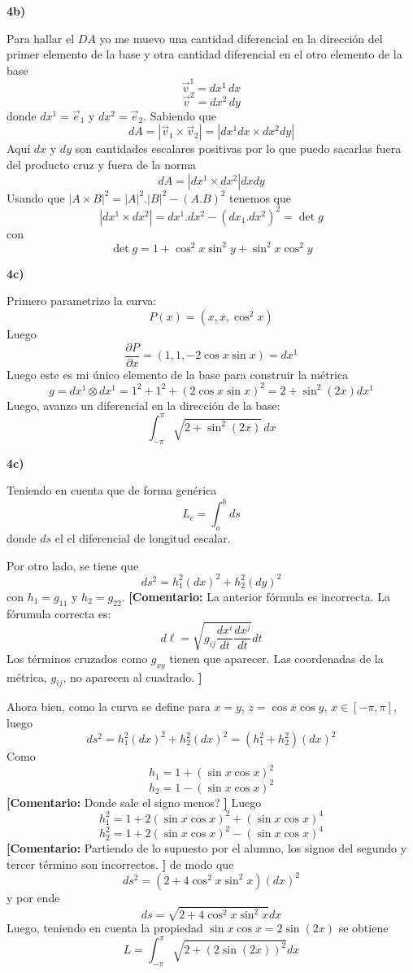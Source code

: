 \documentclass[11pt,spanish]{article}
\newcommand{\comentario}[1]{{\color{red} {\bf [Comentario:} #1 {\bf ]}}}
\begin{document}
\vspace{0.5cm}
{\bf 4b)}
\vspace{0.5cm}

Para hallar el $DA$ yo me muevo una cantidad diferencial en la direcci\'on del primer elemento de la base y otra cantidad diferencial en el otro elemento de la base
$$
\vec{v}^1 = dx^1\, dx
$$
$$
\vec{v}^2 = dx^2\, dy
$$
donde $dx^1 = \vec{e}_1$ y $dx^2 = \vec{e}_2$.
Sabiendo que
$$
dA = |\vec{v}_1 \times \vec{v}_2| = |dx^1 dx \times dx^2 dy|
$$
Aqu\'i $dx$ y $dy$ son cantidades escalares positivas por lo que puedo sacarlas fuera del producto cruz y fuera de la norma
$$
dA = |dx^1 \times dx^2 | dx dy
$$
Usando que $|A\times B|^2 = |A|^2 . |B|^2 - (A.B)^2$ tenemos que
$$
|dx^1 \times dx^2|
=
dx^1 . dx^2 - (dx_1.dx^2)^2 
= 
\det g
$$
con
$$
\det g
=
1+\cos^2 x\sin^2 y + \sin^2 x\cos^2 y
$$

\vspace{0.5cm}
{\bf 4c)}
\vspace{0.5cm}

Primero parametrizo la curva:
$$
P(x) = (x,x,\cos^2 x)
$$
Luego
$$
\frac{\partial P}{\partial x}
=
(1,1,-2\cos x\sin x) 
=
dx^1
$$
Luego este es mi \'unico elemento de la base para construir la m\'etrica
$$
g 
= 
dx^1 \otimes dx^1
=
1^2 + 1^2 + (2\cos x\sin x)^2
=
2+\sin^2(2x) dx^1
$$
Luego, avanzo un diferencial en la direcci\'on de la base:
$$
\int_{-\pi}^{\pi}
\sqrt{2+\sin^2 (2x)}\,dx
$$

\vspace{0.5cm}

\vspace{0.5cm}
{\bf 4c)}
\vspace{0.5cm}

Teniendo en cuenta que de forma gen\'erica
$$
L_c = \int_a^b ds
$$
donde $ds$ el el diferencial de longitud escalar.

Por otro lado, se tiene que
$$
ds^2 = h_1^2 (dx)^2 + h_2^2 (dy)^2
$$
con $h_1 = g_{11}$ y $h_2 = g_{22}$.
\comentario{La anterior f\'ormula es incorrecta. La f\'orumula correcta es:
$$
d\ell = \sqrt{g_{ij}\frac{dx^i}{dt}\frac{dx^j}{dt}}dt
$$
Los t\'erminos cruzados como $g_{xy}$ tienen que aparecer.
Las coordenadas de la m\'etrica, $g_{ij}$, no aparecen al cuadrado.
}

Ahora bien, como la curva se define para $x=y$, $z=\cos x\cos y$, $x\in [-\pi,\pi]$, luego
$$
ds^2 = h_1^2 (dx)^2 + h_2^2 (dx)^2 = (h_1^2 + h_2^2)(dx)^2
$$
Como
$$
h_1 = 1 + (\sin x\cos x)^2
$$
$$
h_2 = 1 - (\sin x\cos x)^2
$$
\comentario{Donde sale el signo menos?}
Luego
$$
h_1^2 = 1 + 2(\sin x\cos x)^2 + (\sin x\cos x)^4
$$
$$
h_2^2 = 1 + 2(\sin x\cos x)^2 - (\sin x\cos x)^4
$$
\comentario{Partiendo de lo supuesto por el alumno, los signos del segundo y tercer t\'ermino son incorrectos.}
de modo que
$$
ds^2 = (2 + 4\cos^2 x\sin^2 x) (dx)^2
$$
y por ende
$$
ds = \sqrt{2 + 4\cos^2 x\sin^2 x} dx
$$
Luego, teniendo en cuenta la propiedad $\sin x\cos x = 2\sin(2x)$ se obtiene
$$
L = \int_{-\pi}^{\pi} \sqrt{2 + (2\sin(2x))^2} dx
$$


%
%
\end{document}
